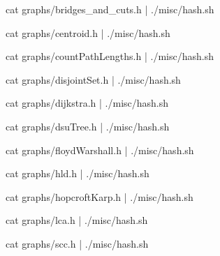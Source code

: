 \documentclass[12pt,letterpaper,twocolumn,landscape]{article}
\begin{document}
\lstlistoflistings
\newpage





cat graphs/bridges_and_cuts.h | ./misc/hash.sh
\END

cat graphs/centroid.h | ./misc/hash.sh
\END

cat graphs/countPathLengths.h | ./misc/hash.sh
\END

cat graphs/disjointSet.h | ./misc/hash.sh
\END

cat graphs/dijkstra.h | ./misc/hash.sh
\END

cat graphs/dsuTree.h | ./misc/hash.sh
\END

cat graphs/floydWarshall.h | ./misc/hash.sh
\END

cat graphs/hld.h | ./misc/hash.sh
\END

cat graphs/hopcroftKarp.h | ./misc/hash.sh
\END

cat graphs/lca.h | ./misc/hash.sh
\END

cat graphs/scc.h | ./misc/hash.sh
\END

\end{document}
